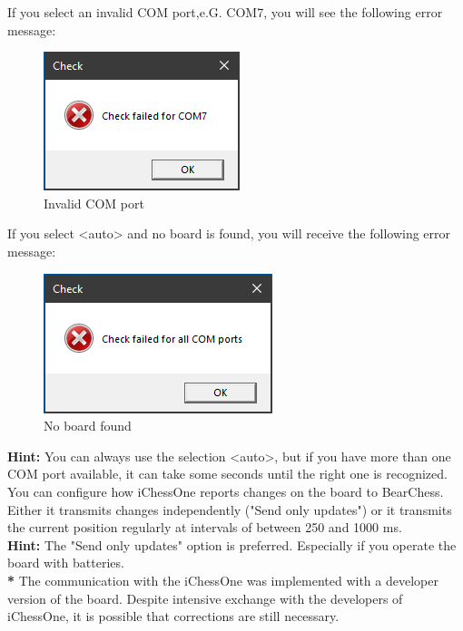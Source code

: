 \documentclass[11pt,a4paper]{article}
\begin{document}
If you select an invalid COM port,e.G. COM7, you will see the following error message:

\begin{figure}[H]
	\centering
	\includegraphics[scale=1.0]{MillenniumChessLink4.png}
	\caption{Invalid COM port }
	\label{fig:iChessOne4}
\end{figure}

If you select <auto> and no board is found, you will receive the following error message:

\begin{figure}[H]
	\centering
	\includegraphics[scale=1.0]{MillenniumChessLink5.png}
	\caption{No board found }
	\label{fig:iChessOne5}
\end{figure}

\textbf{Hint:} You can always use the selection <auto>, but if you have more than one COM port available, it can take some seconds until the right one is recognized.\\

You can configure how iChessOne reports changes on the board to BearChess. Either it transmits changes independently ("Send only updates") or it transmits the current position regularly at intervals of between 250 and 1000 ms.\\
\textbf{Hint:} The "Send only updates" option is preferred. Especially if you operate the board with batteries.\\

{\color{red}\textbf{*}} The communication with the iChessOne was implemented with a developer version of the board. Despite intensive exchange with the developers of iChessOne, it is possible that corrections are still necessary.
\end{document}
